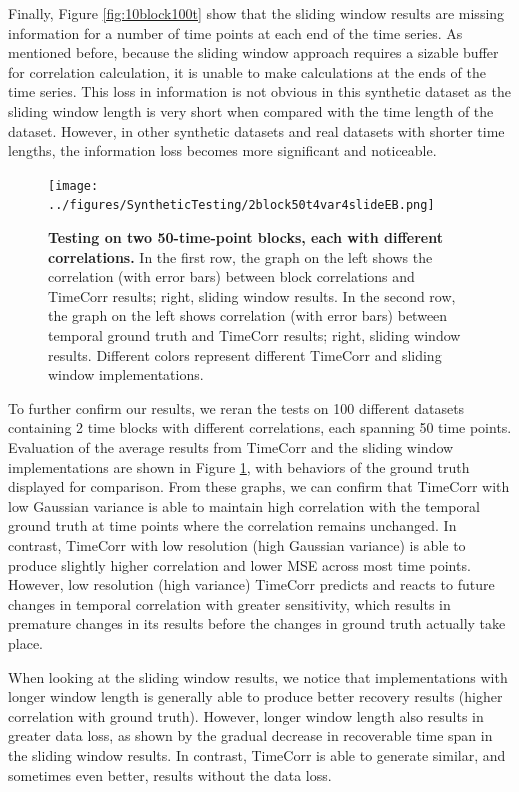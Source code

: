 \documentclass[11pt]{article}
\begin{document}
Finally, Figure \ref{fig:10block100t} show that the sliding window results are missing information for a number of time points at each end of the time series. As mentioned before, because the sliding window approach requires a sizable buffer for correlation calculation, it is unable to make calculations at the ends of the time series. This loss in information is not obvious in this synthetic dataset as the sliding window length is very short when compared with the time length of the dataset. However, in other synthetic datasets and real datasets with shorter time lengths, the information loss becomes more significant and noticeable.

\begin{figure}[!htb]
\texttt{[image: ../figures/SyntheticTesting/2block50t4var4slideEB.png]}
\caption{\textbf{Testing on two 50-time-point blocks, each with different correlations.} In the first row, the graph on the left shows the correlation (with error bars) between block correlations and TimeCorr results; right, sliding window results. In the second row, the graph on the left shows correlation (with error bars) between temporal ground truth and TimeCorr results; right, sliding window results. Different colors represent different TimeCorr and sliding window implementations.}
\label{fig:2block50t}
\end{figure}

To further confirm our results, we reran the tests on 100 different datasets containing 2 time blocks with different correlations, each spanning 50 time points. Evaluation of the average results from TimeCorr and the sliding window implementations are shown in Figure \ref{fig:2block50t}, with behaviors of the ground truth displayed for comparison. From these graphs, we can confirm that TimeCorr with low Gaussian variance is able to maintain high correlation with the temporal ground truth at time points where the correlation remains unchanged. In contrast, TimeCorr with low resolution (high Gaussian variance) is able to produce slightly higher correlation and lower MSE across most time points. However, low resolution (high variance) TimeCorr predicts and reacts to future changes in temporal correlation with greater sensitivity, which results in premature changes in its results before the changes in ground truth actually take place.

When looking at the sliding window results, we notice that implementations with longer window length is generally able to produce better recovery results (higher correlation with ground truth). However, longer window length also results in greater data loss, as shown by the gradual decrease in recoverable time span in the sliding window results. In contrast, TimeCorr is able to generate similar, and sometimes even better, results without the data loss.
\end{document}
